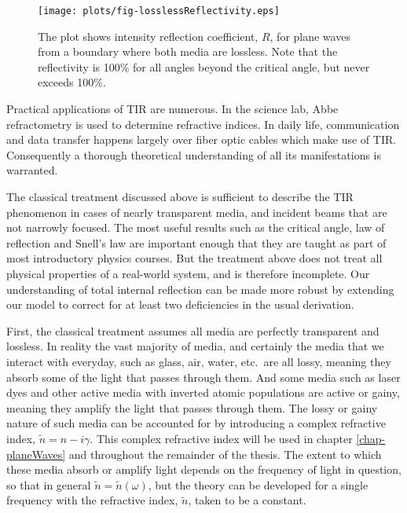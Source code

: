 \documentclass[12pt]{uthesis-v12}
\begin{document}
\begin{figure}[htb]
 \centering
 \texttt{[image: plots/fig-losslessReflectivity.eps]}
 \caption[Reflectivity from a lossless boundary.]
         {The plot shows intensity reflection coefficient, $R$, for plane waves from a boundary where both media are lossless. Note that the reflectivity is 100\% for all angles beyond the critical angle, but never exceeds 100\%.
 \label{fig-losslessReflectivity}}
\end{figure}

Practical applications of TIR are numerous. In the science lab, Abbe refractometry is used to determine refractive indices. In daily life, communication and data transfer happens largely over fiber optic cables which make use of TIR. Consequently a thorough theoretical understanding of all its manifestations is warranted.

The classical treatment discussed above is sufficient to describe the TIR phenomenon in cases of nearly transparent media, and incident beams that are not narrowly focused. The most useful results such as the critical angle, law of reflection and Snell's law are important enough that they are taught as part of most introductory physics courses. But the treatment above does not treat all physical properties of a real-world system, and is therefore incomplete.  Our understanding of total internal reflection can be made more robust by extending our model to correct for at least two deficiencies in the usual derivation.

First, the classical treatment assumes all media are perfectly transparent and  lossless.  In reality the vast majority of media, and certainly the media that we interact with everyday, such as glass, air, water, etc.~are all lossy, meaning they absorb some of the light that passes through them.  And some media such as laser dyes and other active media with inverted atomic populations are active or gainy, meaning they amplify the light that passes through them.  The lossy or gainy nature of such media can be accounted for by introducing a complex refractive index, $\tilde{n}=n-i\gamma$. This complex refractive index will be used in chapter \ref{chap-planeWaves} and throughout the remainder of the thesis. The extent to which these media absorb or amplify light depends on the frequency of light in question, so that in general $\tilde{n}=\tilde{n}(\omega)$, but the theory can be developed for a single frequency with the refractive index, $\tilde{n}$, taken to be a constant.
\end{document}
